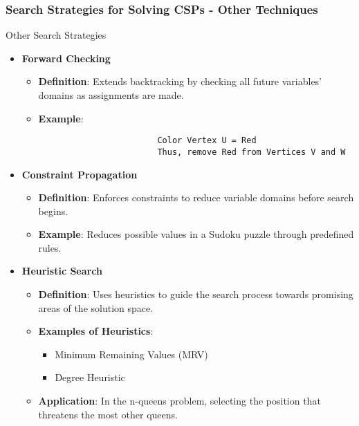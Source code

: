 \documentclass[aspectratio=169]{beamer}
\begin{document}
\begin{frame}[fragile]
    \frametitle{Search Strategies for Solving CSPs - Other Techniques}
    \begin{block}{Other Search Strategies}
        \begin{itemize}
            \item \textbf{Forward Checking}
                \begin{itemize}
                    \item \textbf{Definition}: Extends backtracking by checking all future variables’ domains as assignments are made.
                    \item \textbf{Example}:
                    \begin{lstlisting}
                        Color Vertex U = Red 
                        Thus, remove Red from Vertices V and W
                    \end{lstlisting}
                \end{itemize}
            \item \textbf{Constraint Propagation}
                \begin{itemize}
                    \item \textbf{Definition}: Enforces constraints to reduce variable domains before search begins.
                    \item \textbf{Example}: Reduces possible values in a Sudoku puzzle through predefined rules.
                \end{itemize}
            \item \textbf{Heuristic Search}
                \begin{itemize}
                    \item \textbf{Definition}: Uses heuristics to guide the search process towards promising areas of the solution space.
                    \item \textbf{Examples of Heuristics}:
                    \begin{itemize}
                        \item Minimum Remaining Values (MRV)
                        \item Degree Heuristic
                    \end{itemize}
                    \item \textbf{Application}: In the n-queens problem, selecting the position that threatens the most other queens.
                \end{itemize}
        \end{itemize}
    \end{block}
\end{frame}
\end{document}

